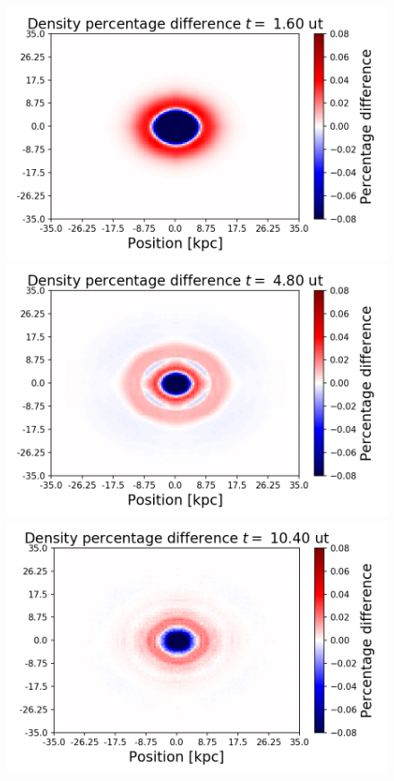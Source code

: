 {\begin{figure}[h!]
    \centering
    \includegraphics[scale=0.45]{imag/c2dDens4.png}
    \includegraphics[scale=0.45]{imag/c2dDens12.png}
    \includegraphics[scale=0.45]{imag/c2dDens26.png}

\end{figure}}
